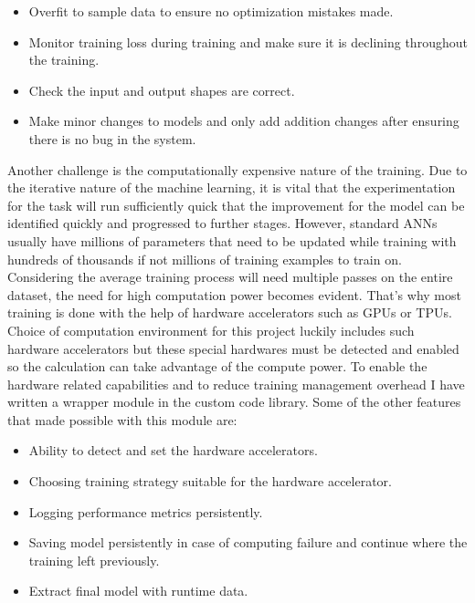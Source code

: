 \begin{itemize}
  \item Overfit to sample data to ensure no optimization mistakes made.
  \item Monitor training loss during training and make sure it is declining throughout the training.
  \item Check the input and output shapes are correct.
  \item Make minor changes to models and only add addition changes after ensuring there is no bug in the system.
\end{itemize}

Another challenge is the computationally expensive nature of the training.
Due to the iterative nature of the machine learning, it is vital that the experimentation for the task will run sufficiently quick that the improvement for the model can be identified quickly and progressed to further stages. 
However, standard ANNs usually have millions of parameters that need to be updated while training with hundreds of thousands if not millions of training examples to train on. 
Considering the average training process will need multiple passes on the entire dataset, the need for high computation power becomes evident.
That's why most training is done with the help of hardware accelerators such as GPUs or TPUs.
Choice of computation environment for this project luckily includes such hardware accelerators but these special hardwares must be detected and enabled so the calculation can take advantage of the compute power.
To enable the hardware related capabilities and to reduce training management overhead I have written a wrapper module in the custom code library.
Some of the other features that made possible with this module are:

\begin{itemize}
  \item Ability to detect and set the hardware accelerators.
  \item Choosing training strategy suitable for the hardware accelerator.
  \item Logging performance metrics persistently.
  \item Saving model persistently in case of computing failure and continue where the training left previously.
  \item Extract final model with runtime data.
\end{itemize}
 

